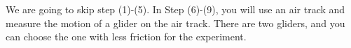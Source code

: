 \documentclass{article}
\begin{document}







We are going to skip step (1)-(5). In Step (6)-(9), you will use an air track and measure the motion of a glider on the air track. There are two gliders, and you can choose the one with less friction for the experiment.
\end{document}
